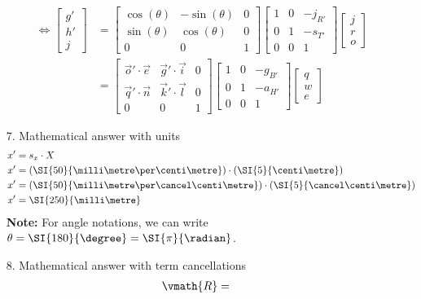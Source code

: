 \documentclass{gif7001}
\begin{document}
\begin{enumerate}
\begin{align*}
        \Leftrightarrow \begin{bmatrix}g'\\h'\\j\end{bmatrix} &= \begin{bmatrix}\cos(\theta)&-\sin(\theta)&0\\\sin(\theta)&\cos(\theta)&0\\0&0&1\end{bmatrix} \begin{bmatrix}1&0&-j_{R'}\\0&1&-s_{T'}\\0&0&1\end{bmatrix} \begin{bmatrix}j\\r\\o\end{bmatrix} \\
        &= \begin{bmatrix}\vec{o}'\cdot\vec{e}&\vec{g}'\cdot\vec{i}&0\\\vec{q}'\cdot\vec{n}&\vec{k}'\cdot\vec{l}&0\\0&0&1\end{bmatrix} \begin{bmatrix}1&0&-g_{B'}\\0&1&-a_{H'}\\0&0&1\end{bmatrix} \begin{bmatrix}q\\w\\e\end{bmatrix}
    \end{align*}
    \item[7.] Mathematical answer with units
    \begin{align*}
        x' & = s_x \cdot X \\
        x' & = \left( \SI{50}{\milli\metre\per\centi\metre} \right) \cdot \left(\SI{5}{\centi\metre}\right) \\
        x' & = \left( \SI{50}{\milli\metre\per\cancel\centi\metre} \right) \cdot \left(\SI{5}{\cancel\centi\metre}\right) \\
        x' & = \SI{250}{\milli\metre}
    \end{align*}
    \textbf{Note: } For angle notations, we can write \(\theta = \SI{180}{\degree} = \SI{\pi}{\radian}\).
    \item[8.] Mathematical answer with term cancellations
    \begin{align*}
        \vmath{R} &=

\end{align*}
\end{enumerate}
\end{document}
